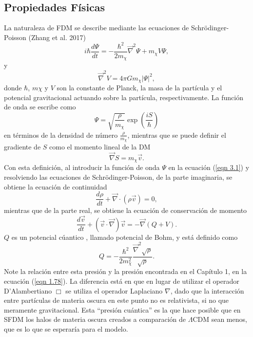 \documentclass[a4paper,openright,12pt]{book}
\begin{document}
\subsection{Propiedades Físicas}
La naturaleza de FDM se describe mediante las ecuaciones de Schrödinger-Poisson (Zhang et al. 2017) \cite{3.1}
\begin{equation}
i\hbar \frac{d \Psi}{dt} 
=
-\frac{\hbar^{2}}{2m_{\chi}} \vec{\nabla}^{2}\Psi + m_{\chi}V\Psi,\label{eqn 3.1}
\end{equation}
y
\begin{equation}
\vec{\nabla}^{2}V = 4\pi G m_{\chi}|\Psi|^{2},\label{eqn 3.2}
\end{equation}
donde $\hbar$, $m\chi$ y $V$ son la constante de Planck, la masa de la partícula y el potencial gravitacional actuando sobre la partícula, respectivamente. La función de onda se escribe como
\begin{equation}
\Psi = \sqrt{\frac{\rho}{m_{\chi}}}\exp(\frac{iS}{\hbar})\label{eqn 3.3}
\end{equation}
en términos de la densidad de número $\frac{\rho}{m_{\chi}}$, mientras que se puede definir el gradiente de $S$ como el momento lineal de la DM
\begin{equation}
\vec{\nabla}S = m_{\chi}\vec{v}.\label{eqn 3.4}
\end{equation}
Con esta definición, al introducir la función de onda $\Psi$ en la ecuación (\ref{eqn 3.1}) y resolviendo las ecuaciones de Schrödinger-Poisson, de la parte imaginaria, se obtiene la ecuación de continuidad
\begin{equation}
\frac{d\rho}{dt} + \vec{\nabla}\cdot(\rho\vec{v}) = 0,\label{eqn 3.5}
\end{equation}
mientras que de la parte real, se obtiene la ecuación de conservación de momento
\begin{equation}
\frac{d\vec{v}}{dt} + (\vec{v}\cdot\vec{\nabla})\vec{v} 
=
-\vec{\nabla}(Q + V).\label{eqn 3.6}
\end{equation}
$Q$ es un potencial cúantico , llamado potencial de Bohm, y está definido como
\begin{equation}
Q 
=
-\frac{\hbar^{2}}{2m^{2}_{\chi}}\frac{\vec{\nabla}^{2}\sqrt{\rho}}{\sqrt{\rho}}.\label{eqn 3.7}
\end{equation}
Note la relación entre esta presión y la presión encontrada en el Capítulo 1, en la ecuación (\ref{eqn 1.78}). La diferencia está en que en lugar de utilizar el operador D'Alambertiano $\Box$ se utiliza el operador Laplaciano $\nabla$, dado que la interacción entre partículas de materia oscura en este punto no es relativista, si no que meramente gravitacional. Esta ``presión cuántica'' es la que hace posible que en SFDM los halos de materia oscura creados a comparación de $\Lambda$CDM sean menos, que es lo que se esperaría para el modelo.
\end{document}
